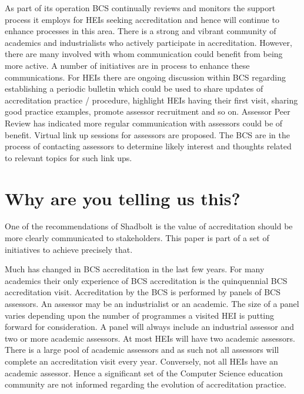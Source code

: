 \documentclass[sigconf]{acmart}
\begin{document}
As part of its operation BCS continually reviews and monitors the support process it employs for HEIs seeking accreditation and hence will continue to enhance processes in this area.
There is a strong and vibrant community of academics and industrialists who actively participate in accreditation. However, there are many involved with whom communication could benefit from being more active. A number of initiatives are in process to enhance these communications. For HEIs there are ongoing discussion within BCS regarding establishing a periodic bulletin which could be used to share updates of accreditation practice / procedure, highlight HEIs having their first visit, sharing good practice examples, promote assessor recruitment and so on. Assessor Peer Review has indicated more regular communication with assessors could be of benefit. Virtual link up sessions for assessors are proposed. The BCS are in the process of contacting assessors to determine likely interest and thoughts related to relevant topics for such link ups.

\section{Why are you telling us this?}	
One of the recommendations of Shadbolt is the value of accreditation should be more clearly communicated to stakeholders. This paper is part of a set of initiatives to achieve precisely that.

Much has changed in BCS accreditation in the last few years. For many academics their only experience of BCS accreditation is the quinquennial BCS accreditation visit. Accreditation by the BCS is performed by panels of BCS assessors. An assessor may be an industrialist or an academic. The size of a panel varies depending upon the number of programmes a visited HEI is putting forward for consideration. A panel will always include an industrial assessor and two or more academic assessors.  At most HEIs will have two academic assessors.  There is a large pool of academic assessors and as such not all assessors will complete an accreditation visit every year. Conversely, not all HEIs have an academic assessor. Hence a significant set of the Computer Science education community are not informed regarding the evolution of accreditation practice.
\end{document}
